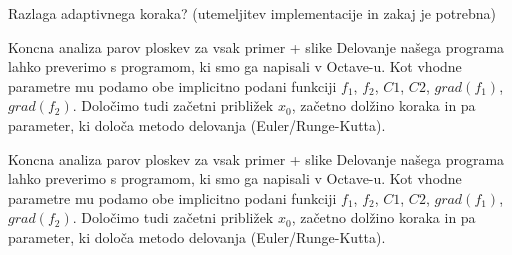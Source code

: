 \documentclass{beamer}
\begin{document}
\begin{frame}{Razlaga adaptivnega koraka? (utemeljitev implementacije in zakaj je potrebna)}

\end{frame}

\begin{frame}{Koncna analiza parov ploskev za vsak primer + slike}
	Delovanje našega programa lahko preverimo s programom, ki smo ga napisali v Octave-u. Kot vhodne parametre mu podamo obe implicitno podani funkciji $f_{1}$, $f_{2}$, $C1$, $C2$, $grad(f_{1})$, $grad(f_{2})$. Določimo tudi začetni približek $x_{0}$, začetno dolžino koraka in pa parameter, ki določa metodo delovanja (Euler/Runge-Kutta).
\end{frame}

\begin{frame}{Koncna analiza parov ploskev za vsak primer + slike}
	Delovanje našega programa lahko preverimo s programom, ki smo ga napisali v Octave-u. Kot vhodne parametre mu podamo obe implicitno podani funkciji $f_{1}$, $f_{2}$, $C1$, $C2$, $grad(f_{1})$, $grad(f_{2})$. Določimo tudi začetni približek $x_{0}$, začetno dolžino koraka in pa parameter, ki določa metodo delovanja (Euler/Runge-Kutta).
\end{frame}
\end{document}
